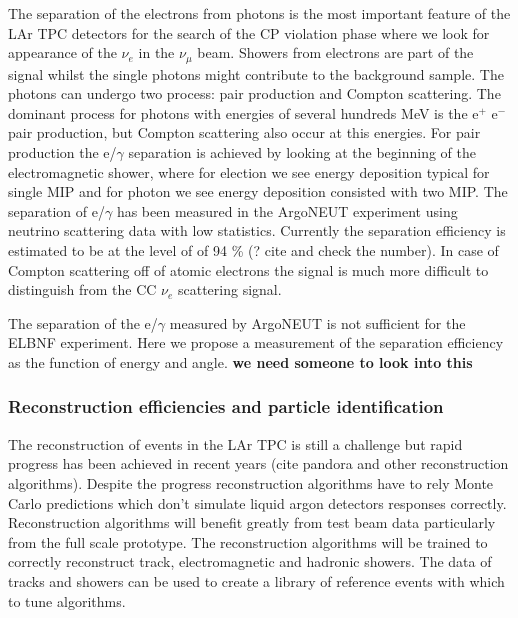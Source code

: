The separation of the electrons from photons is the most important feature of the LAr TPC detectors for the search of the CP violation phase where we look for appearance of the $\nu_e$ in the $\nu_\mu$ beam.  Showers from electrons are part of the signal whilst the single photons might contribute to the background sample. The photons can undergo two process: pair production and Compton scattering. The dominant process for photons with energies of several hundreds MeV  is the e$^+$ e$^-$ pair production, but Compton scattering also occur at this energies. For pair production the e/$\gamma$ separation is achieved by looking at the beginning of the electromagnetic shower, where for election we see energy deposition typical for single MIP and for photon we see energy deposition consisted with two MIP. The separation of e/$\gamma$ has been measured in the ArgoNEUT experiment using neutrino scattering data with low statistics. Currently the separation efficiency is estimated to be at the level of of 94 \% (? cite and check the number). In case of Compton scattering off of atomic electrons the signal is much more difficult to distinguish from the CC $\nu_e$ scattering signal.

The separation of  the e/$\gamma$ measured by ArgoNEUT is not sufficient for the ELBNF experiment. Here we propose a measurement of the separation efficiency  as the function of energy and angle.  {\bf we need someone to look into this}



\subsubsection{Reconstruction efficiencies and particle identification}
\label{detbeam_pid}

The reconstruction of events in the LAr TPC is still a challenge but rapid progress has been achieved in recent years (cite pandora and other reconstruction algorithms). Despite the progress reconstruction algorithms have to rely Monte Carlo predictions which don't simulate liquid argon detectors responses correctly. Reconstruction algorithms will benefit greatly from test beam data particularly from the full scale prototype. The reconstruction algorithms will be trained to correctly reconstruct track, electromagnetic and hadronic showers.
The data of tracks and showers can be used to create a library of reference events with which to tune algorithms.

